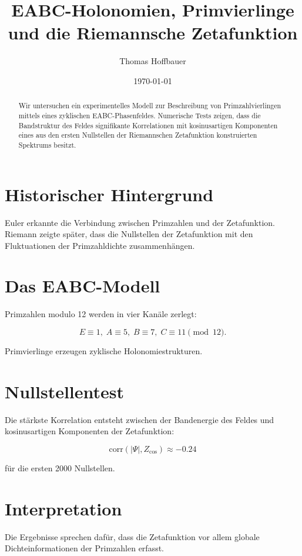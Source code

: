 \documentclass[11pt,a4paper]{article}
\title{EABC-Holonomien, Primvierlinge und die Riemannsche Zetafunktion}
\author{Thomas Hoffbauer}
\date{\today}
\begin{document}
\maketitle

\begin{abstract}
Wir untersuchen ein experimentelles Modell zur Beschreibung von Primzahlvierlingen
mittels eines zyklischen EABC-Phasenfeldes. Numerische Tests zeigen,
dass die Bandstruktur des Feldes signifikante Korrelationen mit
kosinusartigen Komponenten eines aus den ersten Nullstellen der
Riemannschen Zetafunktion konstruierten Spektrums besitzt.
\end{abstract}

\section{Historischer Hintergrund}

Euler erkannte die Verbindung zwischen Primzahlen und der Zetafunktion.
Riemann zeigte später, dass die Nullstellen der Zetafunktion
mit den Fluktuationen der Primzahldichte zusammenhängen.

\section{Das EABC-Modell}

Primzahlen modulo 12 werden in vier Kanäle zerlegt:

\[
E \equiv 1,\;
A \equiv 5,\;
B \equiv 7,\;
C \equiv 11 \pmod{12}.
\]

Primvierlinge erzeugen zyklische Holonomiestrukturen.

\section{Nullstellentest}

Die stärkste Korrelation entsteht zwischen der Bandenergie
des Feldes und kosinusartigen Komponenten der Zetafunktion:

\[
\mathrm{corr}(|\Psi|,Z_{\cos}) \approx -0.24
\]

für die ersten 2000 Nullstellen.

\section{Interpretation}

Die Ergebnisse sprechen dafür, dass die Zetafunktion vor allem
globale Dichteinformationen der Primzahlen erfasst.
\end{document}
